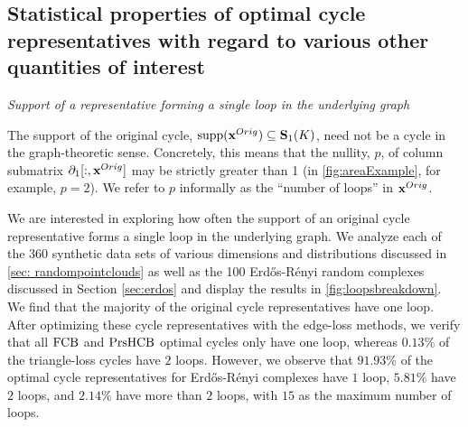 \subsection{Statistical properties of optimal cycle representatives with regard to various other quantities of interest}



\noindent \emph{Support of a representative forming a single loop in the underlying graph}

The support of the original cycle, $\mathrm{supp}(\mathbf{x}^{Orig}) \subseteq \mathbf{S}_1(K)$, need not be a cycle in the graph-theoretic sense.  Concretely, this means that the nullity, $p$, of column submatrix $\partial_1[:,\mathbf{x}^{Orig}]$ may be strictly greater than 1 (in \fig \ref{fig:areaExample}, for example, $p=2$).  We refer to $p$ informally as the ``number of loops'' in $\mathbf{x}^{Orig}$. 


We are interested in exploring how often the support of an original cycle representative forms a single loop in the underlying graph. We analyze each of the 360 synthetic data sets of various dimensions and distributions discussed in \se \ref{sec: randompointclouds} as well as the 100 Erd\H{o}s-R\'enyi random complexes discussed in Section \ref{sec:erdos} and display the results in \fig \ref{fig:loopsbreakdown}. We find that the majority of the original cycle representatives have one loop. %
After optimizing these cycle representatives with the edge-loss methods, we verify that all $\mathrm{FCB}$ and $\mathrm{PrsHCB}$ optimal cycles only have one loop, whereas $0.13\%$ of the triangle-loss cycles have $2$ loops. However, we observe that $91.93\%$ of the optimal cycle representatives for Erd\H{o}s-R\'enyi complexes have $1$ loop, $5.81\%$ have $2$ loops, and $2.14\%$ have more than $2$ loops, with $15$ as the maximum number of loops. 

